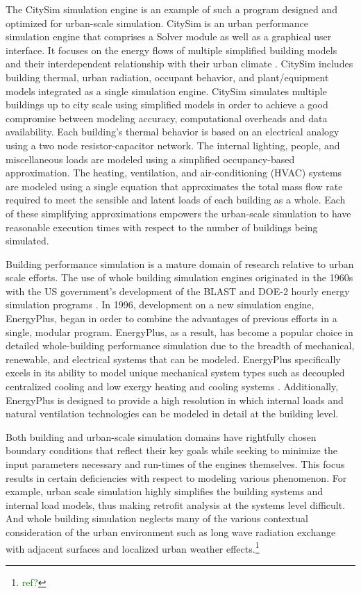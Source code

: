 \documentclass{tBPS2e}
\theoremstyle{plain}
\theoremstyle{definition}
\theoremstyle{remark}
\newcommand{\noteDT}[1]{\footnote{\textcolor{green}{#1}}}
\begin{document}
The CitySim simulation engine is an example of such a program designed and optimized for urban-scale simulation. CitySim is an urban performance simulation engine that comprises a Solver module as well as a graphical user interface. It focuses on the energy flows of multiple simplified building models and their interdependent relationship with their urban climate \citep{Robinson:2009tm}. CitySim includes building thermal, urban radiation, occupant behavior, and plant/equipment models integrated as a single simulation engine. CitySim simulates multiple buildings up to city scale using simplified models in order to achieve a good compromise between modeling accuracy, computational overheads and data availability. Each building's thermal behavior is based on an electrical analogy using a two node resistor-capacitor network. The internal lighting, people, and miscellaneous loads are modeled using a simplified occupancy-based approximation. The heating, ventilation, and air-conditioning (HVAC) systems are modeled using a single equation that approximates the total mass flow rate required to meet the sensible and latent loads of each building as a whole. Each of these simplifying approximations empowers the urban-scale simulation to have reasonable execution times with respect to the number of buildings being simulated.

Building performance simulation is a mature domain of research relative to urban scale efforts. The use of whole building simulation engines originated in the 1960s with the US government's development of the BLAST and DOE-2 hourly energy simulation programs \citep{Lawrie:2001vf}. In 1996, development on a new simulation engine, EnergyPlus, began in order to combine the advantages of previous efforts in a single, modular program. EnergyPlus, as a result, has become a popular choice in detailed whole-building performance simulation due to the breadth of mechanical, renewable, and electrical systems that can be modeled. EnergyPlus specifically excels in its ability to model unique mechanical system types such as decoupled centralized cooling \citep{Miller:2010wa} and low exergy heating and cooling systems \citep{barbara:2015tz}. Additionally, EnergyPlus is designed to provide a high resolution in which internal loads and natural ventilation technologies can be modeled in detail at the building level.  

Both building and urban-scale simulation domains have rightfully chosen boundary conditions that reflect their key goals while seeking to minimize the input parameters necessary and run-times of the engines themselves. This focus results in certain deficiencies with respect to modeling various phenomenon. For example, urban scale simulation highly simplifies the building systems and internal load models, thus making retrofit analysis at the systems level difficult. And whole building simulation neglects many of the various contextual consideration of the urban environment such as long wave radiation exchange with adjacent surfaces and localized urban weather effects.\noteDT{ref?}
\end{document}
